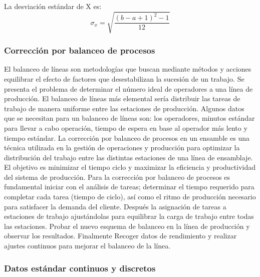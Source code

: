         La desviación estándar de X es:
        \begin{equation}
        \sigma_x=\sqrt{\dfrac{(b-a+1)^2-1}{12}}
        \end{equation}
    \subsubsection{Corrección por balanceo de procesos}
    
    El balanceo de líneas son metodologías que buscan mediante métodos y acciones equilibrar el efecto de factores que desestabilizan la sucesión de un trabajo.
    Se presenta el problema de determinar el número ideal de operadores a una línea de producción. El balanceo de líneas más elemental sería distribuir las tareas de trabajo de manera uniforme entre las estaciones de producción. Algunos datos que se necesitan para un balanceo de líneas son: los operadores, minutos estándar para llevar a cabo operación, tiempo de espera en base al operador más lento y tiempo estándar.
    La corrección por balanceo de procesos en un ensamble es una técnica utilizada en la gestión de operaciones y producción para optimizar la distribución del trabajo entre las distintas estaciones de una línea de ensamblaje. El objetivo es minimizar el tiempo ciclo y maximizar la eficiencia y productividad del sistema de producción.
    Para la corrección por balanceo de procesos es fundamental iniciar con el análisis de tareas; determinar el tiempo requerido para completar cada tarea (tiempo de ciclo), así como el ritmo de producción necesario para satisfacer la demanda del cliente. Después la asignación de tareas a estaciones de trabajo ajustándolas para equilibrar la carga de trabajo entre todas las estaciones. Probar el nuevo esquema de balanceo en la línea de producción y observar los resultados. Finalmente Recoger datos de rendimiento y realizar ajustes continuos para mejorar el balanceo de la línea.\cite{Balanceodelíneas} 
    \subsubsection{Datos estándar continuos y discretos}
    

